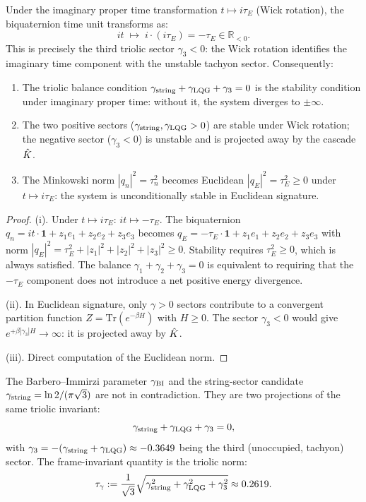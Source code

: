 \begin{theorem}\label{thm:wick}
Under the imaginary proper time transformation $t\mapsto i\tau_E$
(Wick rotation), the biquaternion time unit transforms as:
\[
  it \;\mapsto\; i\cdot(i\tau_E) = -\tau_E \in\mathbb{R}_{<0}.
\]
This is precisely the third triolic sector $\gamma_3<0$: the Wick
rotation identifies the imaginary time component with the unstable
tachyon sector.
Consequently:
\begin{enumerate}[label=(\roman*)]
  \item The triolic balance condition
        $\gamma_{\mathrm{string}}+\gamma_{\mathrm{LQG}}+\gamma_3=0$ is the stability
        condition under imaginary proper time: without it, the system
        diverges to $\pm\infty$.
  \item The two positive sectors ($\gamma_{\mathrm{string}},\gamma_{\mathrm{LQG}}>0$)
        are stable under Wick rotation; the negative sector
        ($\gamma_3<0$) is unstable and is projected away by the
        cascade $\hat{K}$.
  \item The Minkowski norm $|q_n|^2=\tau_n^2$ becomes Euclidean
        $|q_E|^2=\tau_E^2\geq 0$ under $t\mapsto i\tau_E$: the system
        is unconditionally stable in Euclidean signature.
\end{enumerate}
\begin{proof}
(i). Under $t\mapsto i\tau_E$: $it\mapsto -\tau_E$.
The biquaternion $q_n=it\cdot\mathbf{1}+z_1 e_1+z_2 e_2+z_3 e_3$ becomes
$q_E=-\tau_E\cdot\mathbf{1}+z_1 e_1+z_2 e_2+z_3 e_3$
with norm $|q_E|^2=\tau_E^2+|z_1|^2+|z_2|^2+|z_3|^2\geq 0$.
Stability requires $\tau_E^2\geq 0$, which is always satisfied.
The balance $\gamma_1+\gamma_2+\gamma_3=0$ is equivalent to requiring
that the $-\tau_E$ component does not introduce a net positive energy
divergence.

(ii). In Euclidean signature, only $\gamma>0$ sectors contribute to a
convergent partition function $Z=\mathrm{Tr}(e^{-\beta H})$ with $H\geq 0$.
The sector $\gamma_3<0$ would give $e^{+\beta|\gamma_3|H}\to\infty$:
it is projected away by $\hat{K}$.

(iii). Direct computation of the Euclidean norm.
\end{proof}
\end{theorem}

\begin{theorem}
\label{thm:triolic-gBI}
The Barbero--Immirzi parameter $\gamma_{\mathrm{BI}}$ and the string-sector candidate
$\gamma_{\mathrm{string}} = \ln 2/(\pi\sqrt{3})$ are not in contradiction.
They are two projections of the same triolic invariant:
\[
  \gamma_{\mathrm{string}} + \gamma_{\mathrm{LQG}} + \gamma_3 = 0,
\]
with $\gamma_3 = -(\gamma_{\mathrm{string}}+\gamma_{\mathrm{LQG}})\approx -0.3649$ being
the third (unoccupied, tachyon) sector.
The frame-invariant quantity is the triolic norm:
\[
  \tau_\gamma := \frac{1}{\sqrt{3}}
  \sqrt{\gamma_{\mathrm{string}}^2+\gamma_{\mathrm{LQG}}^2+\gamma_3^2}\approx 0.2619.
\]
\end{theorem}

